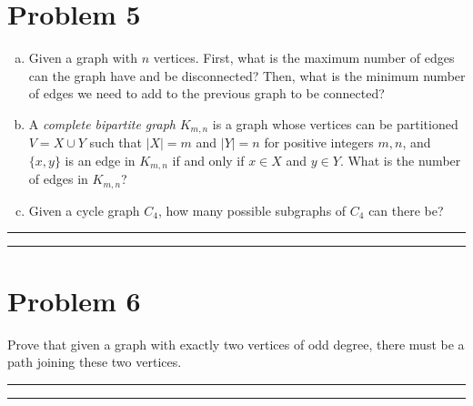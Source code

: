 \documentclass{article}
\theoremstyle{definition}
\newenvironment{solution}{\bigskip\hrule{\hfill}}{\bigskip\hrule{\hfill}} %
\begin{document}
\section*{Problem 5}
\begin{enumerate}[a)] %
	\item Given a graph with $n$ vertices. First, what is the maximum number of edges can the graph have and be disconnected? Then, what is the minimum number of edges we need to add to the previous graph to be connected?
	\item A \emph{complete bipartite graph} $K_{m,n}$ is a graph whose vertices can be partitioned $V=X\cup Y$ such that $|X|=m$ and  $|Y|=n$ for positive integers $m,n$, and $\{x, y\}$ is an edge in $K_{m,n}$ if and only if $x\in X$ and $y\in Y$. What is the number of edges in $K_{m,n}$?
	\item Given a cycle graph $C_4$, how many possible subgraphs of $C_4$ can there be?
\end{enumerate}
\begin{solution}


\end{solution}


\newpage


\section*{Problem 6}
Prove that given a graph with exactly two vertices of odd degree, there must be a path joining these two vertices.
\begin{solution}


\end{solution}


\newpage

\end{document}
